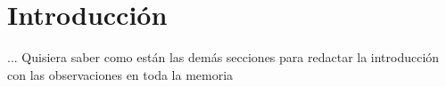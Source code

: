 \label{chapter:introduccion}\chapter{Introducción}

... Quisiera saber como están las demás secciones para redactar la introducción con las observaciones en toda la memoria









